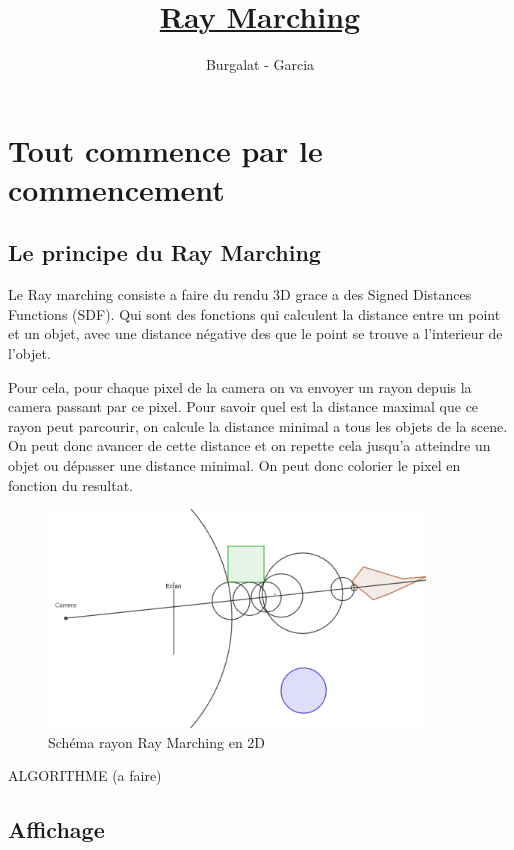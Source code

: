\documentclass{article}
\title{\underline{Ray Marching}}
\date{}
\author{Burgalat - Garcia}
\begin{document}
\maketitle
\tableofcontents
\clearpage

\section{Tout commence par le commencement}
\subsection{Le principe du Ray Marching}

Le Ray marching consiste a faire du rendu 3D grace a des Signed Distances Functions (SDF). 
Qui sont des fonctions qui calculent la distance entre un point et un objet, avec une distance négative des que le point se trouve a l'interieur de l'objet.

Pour cela, pour chaque pixel de la camera on va envoyer un rayon depuis la camera passant par ce pixel. 
Pour savoir quel est la distance maximal que ce rayon peut parcourir, on calcule la distance minimal a tous les objets de la scene. 
On peut donc avancer de cette distance et on repette cela jusqu'a atteindre un objet ou dépasser une distance minimal. 
On peut donc colorier le pixel en fonction du resultat.

\begin{figure}[H]
    \begin{center}
        \includegraphics[width=10cm]{images/Shema_1_ray_marching_2d.png}\caption{Schéma rayon Ray Marching en 2D}
    \end{center}
\end{figure}

\medskip
ALGORITHME (a faire)



\subsection{Affichage}
\end{document}
